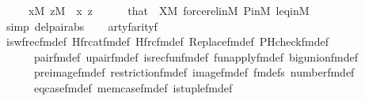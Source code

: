 \begin{isabellebody}
\ \ \ \ \ {\isachardoublequoteopen}x{\isasymin}M{\isachardoublequoteclose}\ {\isachardoublequoteopen}z{\isasymin}M{\isachardoublequoteclose}\ \ x\ z\isanewline
\ \ \ \ \isamarkupfalse%
\ that\ {}\ {\isacartoucheopen}X{\isasymin}M{\isacartoucheclose}\ forcerel{\isacharunderscore}{\kern0pt}in{\isacharunderscore}{\kern0pt}M\ P{\isacharunderscore}{\kern0pt}in{\isacharunderscore}{\kern0pt}M\ leq{\isacharunderscore}{\kern0pt}in{\isacharunderscore}{\kern0pt}M\ \isamarkupfalse%
\ {\isacharparenleft}{\kern0pt}simp\ del{\isacharcolon}{\kern0pt}pair{\isacharunderscore}{\kern0pt}abs{\isacharparenright}{\kern0pt}\isanewline
\ \ \isamarkupfalse%
\ artyf{\isacharcolon}{\kern0pt}{\isachardoublequoteopen}arity{\isacharparenleft}{\kern0pt}{\isacharquery}{\kern0pt}f{\isacharparenright}{\kern0pt}\ {\isacharequal}{\kern0pt}\ {}{\isachardoublequoteclose}\isanewline
\ \ \ \ \isamarkupfalse%
\ is{\isacharunderscore}{\kern0pt}wfrec{\isacharunderscore}{\kern0pt}fm{\isacharunderscore}{\kern0pt}def\ Hfrc{\isacharunderscore}{\kern0pt}at{\isacharunderscore}{\kern0pt}fm{\isacharunderscore}{\kern0pt}def\ Hfrc{\isacharunderscore}{\kern0pt}fm{\isacharunderscore}{\kern0pt}def\ Replace{\isacharunderscore}{\kern0pt}fm{\isacharunderscore}{\kern0pt}def\ PHcheck{\isacharunderscore}{\kern0pt}fm{\isacharunderscore}{\kern0pt}def\isanewline
\ \ \ \ \ \ pair{\isacharunderscore}{\kern0pt}fm{\isacharunderscore}{\kern0pt}def\ upair{\isacharunderscore}{\kern0pt}fm{\isacharunderscore}{\kern0pt}def\ is{\isacharunderscore}{\kern0pt}recfun{\isacharunderscore}{\kern0pt}fm{\isacharunderscore}{\kern0pt}def\ fun{\isacharunderscore}{\kern0pt}apply{\isacharunderscore}{\kern0pt}fm{\isacharunderscore}{\kern0pt}def\ big{\isacharunderscore}{\kern0pt}union{\isacharunderscore}{\kern0pt}fm{\isacharunderscore}{\kern0pt}def\isanewline
\ \ \ \ \ \ pre{\isacharunderscore}{\kern0pt}image{\isacharunderscore}{\kern0pt}fm{\isacharunderscore}{\kern0pt}def\ restriction{\isacharunderscore}{\kern0pt}fm{\isacharunderscore}{\kern0pt}def\ image{\isacharunderscore}{\kern0pt}fm{\isacharunderscore}{\kern0pt}def\ fm{\isacharunderscore}{\kern0pt}defs\ number{}{\isacharunderscore}{\kern0pt}fm{\isacharunderscore}{\kern0pt}def\isanewline
\ \ \ \ \ \ eq{\isacharunderscore}{\kern0pt}case{\isacharunderscore}{\kern0pt}fm{\isacharunderscore}{\kern0pt}def\ mem{\isacharunderscore}{\kern0pt}case{\isacharunderscore}{\kern0pt}fm{\isacharunderscore}{\kern0pt}def\ is{\isacharunderscore}{\kern0pt}tuple{\isacharunderscore}{\kern0pt}fm{\isacharunderscore}{\kern0pt}def\isanewline

\end{isabellebody}

